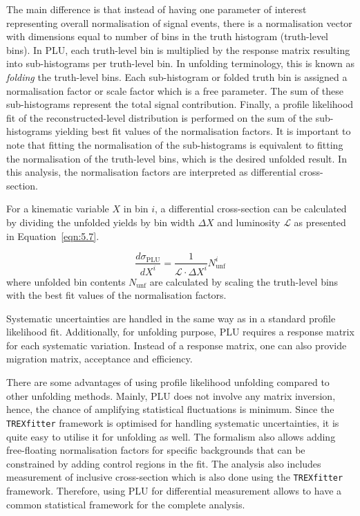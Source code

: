 The main difference is that instead of having one parameter of interest 
representing overall normalisation of signal events, there is a normalisation vector
with dimensions equal to number of bins in the truth histogram (truth-level bins).  
In PLU, each truth-level bin 
is multiplied by the response matrix resulting into sub-histograms per truth-level bin. 
In unfolding terminology, this is known as
\textit{folding} the truth-level bins. Each sub-histogram or folded truth bin 
is assigned a normalisation factor or scale factor which is a free parameter. The
sum of these sub-histograms represent the total signal contribution. Finally, a 
profile likelihood fit of the reconstructed-level distribution is 
performed on the sum of the sub-histograms yielding best fit values
of the normalisation factors. It is important to note that
fitting the normalisation of the sub-histograms is equivalent
to fitting the normalisation of the truth-level bins, which is the 
desired unfolded result. In this analysis, the normalisation factors are 
interpreted as differential cross-section. 

For a kinematic variable $X$ in bin $i$, a differential cross-section can be calculated by 
dividing the unfolded yields by bin width $\Delta X$ and luminosity $\mathcal{L}$ as 
presented in Equation~\ref{eqn:5.7}.

\begin{equation}
    \frac{d\sigma_{\text{PLU}}}{d X^i} = \frac{1}{\mathcal{L} \cdot \Delta X^i} N_{\text{unf}}^i
    \label{eqn:5.7}
\end{equation}
where unfolded bin contents $N_{\text{unf}}$ are calculated by scaling the truth-level bins with
the best fit values of the normalisation factors. 


Systematic uncertainties are handled in the same way as in a standard profile likelihood fit.
Additionally, for unfolding purpose, PLU requires a response matrix for each systematic 
variation. Instead of a response matrix, one can also provide migration matrix, acceptance
and efficiency.

There are some advantages of using profile likelihood unfolding compared to other unfolding methods.
Mainly, PLU does not involve any matrix inversion, hence, the chance of amplifying statistical
fluctuations is minimum. Since the \texttt{TREXfitter} framework is optimised for handling
systematic uncertainties, it is quite easy to utilise it for unfolding as well. 
The formalism also allows adding free-floating normalisation factors for 
specific backgrounds that can be constrained by adding control regions in the fit.
The \tZq analysis also includes measurement of inclusive cross-section which is also 
done using the \texttt{TREXfitter} framework. Therefore, using PLU for differential
measurement allows to have a common statistical framework for the complete analysis.